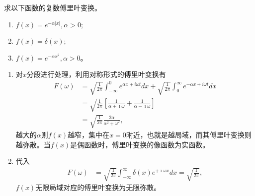 \begin{examplebox}{
求以下函数的复数傅里叶变换。
\begin{enumerate}
    \item $f(x) = e^{-\alpha |x|}, \alpha > 0$;
    \item $f(x) = \delta (x)$;
    \item $f(x) = e^{-\alpha x^2}, \alpha > 0$。
\end{enumerate}
}
\begin{enumerate}
    \item 对$x$分段进行处理，利用对称形式的傅里叶变换有
    \begin{align}
        F(\omega) &=
        \sqrt{\frac{1}{2 \pi}} \int_{-\infty}^0 e^{\alpha x+i \omega t} dx \nonumber
        +
        \sqrt{\frac{1}{2 \pi}} \int_0^{\infty} e^{-\alpha x+i \omega t} dx  \nonumber
        \\
        &= \sqrt{\frac{1}{2 \pi}} \left[\frac{1}{\alpha + \imath \omega } + \frac{1}{\alpha - \imath \omega } \right] \nonumber
        \\
        &= \sqrt{\frac{1}{2 \pi}} \frac{2\alpha}{\alpha^2 + \omega^2}, \nonumber
    \end{align}
    越大的$\alpha$则$f(x)$越窄，集中在$x=0$附近，也就是越局域，而其傅里叶变换则越弥散。当$f(x)$是偶函数时，傅里叶变换的像函数为实函数。

    \item 代入
    \begin{align}
        F(\omega) &=
        \sqrt{\frac{1}{2 \pi}} \int_{-\infty}^{\infty} \delta(x) e^{+\imath \omega x} d x = \sqrt{\frac{1}{2 \pi}} ,
    \end{align}
    $f(x)$无限局域对应的傅里叶变换为无限弥散。


\end{enumerate}
\end{examplebox}
